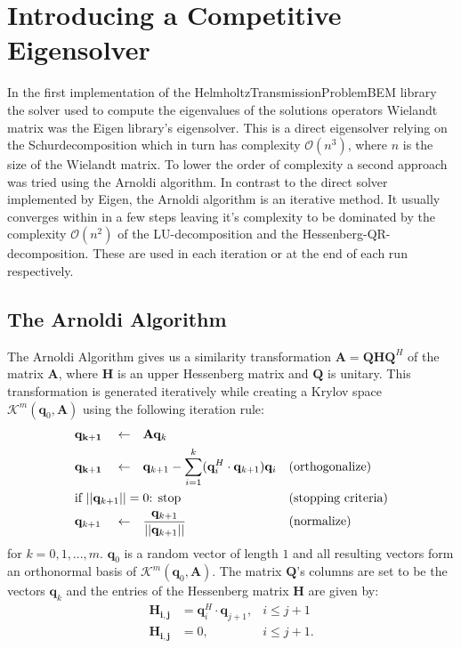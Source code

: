 \documentclass[a4paper, oneside]{discothesis}
\begin{document}
\chapter{Introducing a Competitive Eigensolver}
In the first implementation of the HelmholtzTransmissionProblemBEM library the solver used to compute the eigenvalues of the solutions operators Wielandt matrix was the Eigen library's eigensolver.
This is a direct eigensolver relying on the Schurdecomposition which in turn has complexity $\mathcal{O}(n^3)$, where $n$ is the size of the Wielandt matrix.
To lower the order of complexity a second approach was tried using the Arnoldi algorithm. 
In contrast to the direct solver implemented by Eigen, the Arnoldi algorithm is an iterative method.
It usually converges within in a few steps leaving it's complexity to be dominated by the complexity $\mathcal{O}(n^2)$ of the LU-decomposition and the Hessenberg-QR-decomposition.
These are used in each iteration or at the end of each run respectively.

\section{The Arnoldi Algorithm}
The Arnoldi Algorithm gives us a similarity transformation $\mathbf{A}=\mathbf{QHQ}^H$ of the matrix $\mathbf{A}$, where $\mathbf{H}$ is an upper Hessenberg matrix and $\mathbf{Q}$ is unitary.
This transformation is generated iteratively while creating a Krylov space $\mathcal{K}^{m}(\mathbf{q}_0, \mathbf{A})$ using the following iteration rule:
\begin{align}
	&\mathbf{q_{k+1}}&  &\leftarrow& &\mathbf{A}\mathbf{q}_{k}& & \label{eq:arit1}\\
	&\mathbf{q_{k+1}}&  &\leftarrow& &\mathbf{q}_{k+1} - \sum_{i=1}^{k} (\mathbf{q}_i^H \cdot \mathbf{q}_{k+1}) \mathbf{q}_i& & \text{(orthogonalize)}\\
	& \text{if } ||\mathbf{q}_{k+1}||=0 \text{: stop} \span\span\span\span& &\text{(stopping criteria)} \\
	& \mathbf{q}_{k+1}& &\leftarrow& &\frac{\mathbf{q}_{k+1}}{||\mathbf{q}_{k+1}||}& &\text{(normalize)} \label{eq:arit2}
\end{align}
for $k=0,1,...,m$. $\mathbf{q}_0$ is a random vector of length $1$ and all resulting vectors form an orthonormal basis of $\mathcal{K}^m(\mathbf{q}_0,\mathbf{A})$.
The matrix $\mathbf{Q}$'s columns are set to be the vectors $\mathbf{q}_k$ and the entries of the Hessenberg matrix $\mathbf{H}$ are given by:
\begin{align}
	\mathbf{H_{i,j}}& = \mathbf{q}_i^H \cdot \mathbf{q}_{j+1},& i \leq j+1 \\
	\mathbf{H_{i,j}}& = 0,& i \leq j+1.
\end{align}
\end{document}
